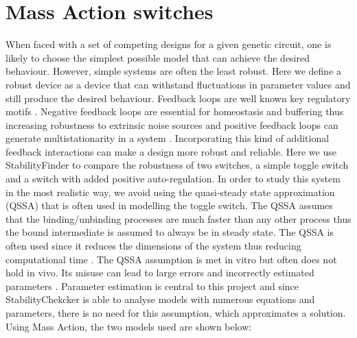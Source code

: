 \section{Mass Action switches}

When faced with a set of competing designs for a given genetic circuit, one is likely to choose the simplest possible model that can achieve the desired behaviour. However, simple systems are often the least robust. Here we define a robust device as a device that can withstand fluctuations in parameter values and still produce the desired behaviour. Feedback loops are well known key regulatory motifs \autocite{Brandman:2005ci}. Negative feedback loops are essential for homeostasis and buffering \autocite{Thomas:1995id} thus increasing robustness to extrinsic noise sources and positive feedback loops can generate multistationarity in a system \autocite{Thomas:1995id}. Incorporating this kind of additional feedback interactions can make a design more robust and reliable. Here we use StabilityFinder to compare the robustness of two switches, a simple toggle switch and a switch with added positive auto-regulation. 
In order to study this system in the most realistic way, we avoid using the quasi-steady state approximation (QSSA) that is often used in modelling the toggle switch. The QSSA assumes that the binding/unbinding processes are much faster than any other process \autocite{Loinger:2007vma} thus the bound intermediate is assumed to always be in steady state. The QSSA is often used since it reduces the dimensions of the system thus reducing computational time \autocite{Pedersen:2007ke}. The QSSA assumption is met in vitro but often does not hold in vivo. Its misuse can lead to large errors and incorrectly estimated parameters \autocite{Pedersen:2007ke}. Parameter estimation is central to this project and since StabilityChekcker is able to analyse models with numerous equations and parameters, there is no need for this assumption, which approximates a solution. Using Mass Action, the two models used are shown below:

